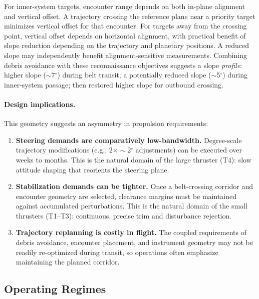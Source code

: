 \documentclass{article}
\begin{document}
For inner-system targets, encounter range depends on both in-plane alignment and vertical offset. A trajectory crossing the reference plane near a priority target minimizes vertical offset for that encounter. For targets away from the crossing point, vertical offset depends on horizontal alignment, with practical benefit of slope reduction depending on the trajectory and planetary positions. A reduced slope may independently benefit alignment-sensitive measurements. Combining debris avoidance with these reconnaissance objectives suggests a slope \emph{profile}: higher slope ($\sim$7$^\circ$) during belt transit; a potentially reduced slope ($\sim$5$^\circ$) during inner-system passage; then restored higher slope for outbound crossing.

\paragraph{Design implications.}
This geometry suggests an asymmetry in propulsion requirements:
\begin{enumerate}
\item \textbf{Steering demands are comparatively low-bandwidth.} Degree-scale trajectory modifications (e.g., $2\times\sim$2$^\circ$ adjustments) can be executed over weeks to months. This is the natural domain of the large thruster (T4): slow attitude shaping that reorients the steering plane.

\item \textbf{Stabilization demands can be tighter.} Once a belt-crossing corridor and encounter geometry are selected, clearance margins must be maintained against accumulated perturbations. This is the natural domain of the small thrusters (T1--T3): continuous, precise trim and disturbance rejection.

\item \textbf{Trajectory replanning is costly in flight.} The coupled requirements of debris avoidance, encounter placement, and instrument geometry may not be readily re-optimized during transit, so operations often emphasize maintaining the planned corridor.
\end{enumerate}


\subsection{Operating Regimes}
\label{sec:operating_regimes}
\end{document}
